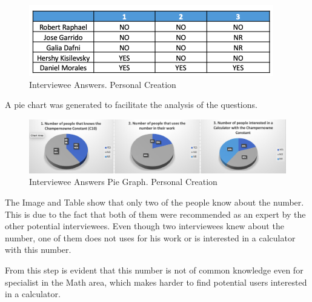 \documentclass{report}
\begin{document}
\begin{figure}[H]
\includegraphics[scale=0.8]{images/table.png}
\caption[Interviewee Answers]{Interviewee Answers. Personal Creation}
\end{figure}


A pie chart was generated to facilitate the analysis of the questions.\\

\begin{figure}[H]
\includegraphics[scale=0.4]{images/pie.png}
\caption[Interviewee Answers Pie Graph]{Interviewee Answers Pie Graph. Personal Creation}
\end{figure}


The Image and Table show that only two of the people know about the number. This is due to the fact that both of them were recommended as an expert by the other potential interviewees. Even though two interviewees knew about the number, one of them does not uses for his work or is interested in a calculator with this number.

From this step is evident that this number is not of common knowledge even for specialist in the Math area, which makes harder to find potential users interested in a calculator.
\end{document}

